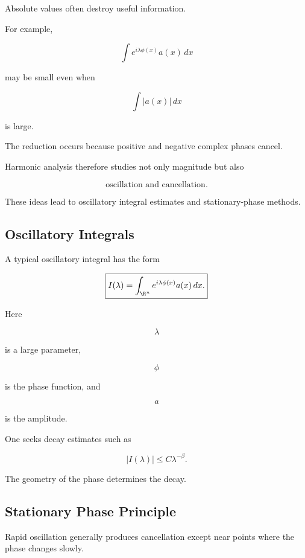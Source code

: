 Absolute values often destroy useful information.

For example,

\[
\int
e^{i\lambda\phi(x)}
a(x)\,dx
\]

may be small even when

\[
\int|a(x)|\,dx
\]

is large.

The reduction occurs because positive and negative complex phases cancel.

Harmonic analysis therefore studies not only magnitude but also

\[
\boxed{
\text{oscillation and cancellation}.
}
\]

These ideas lead to oscillatory integral estimates and stationary-phase
methods.

\subsection{Oscillatory Integrals}
\label{subsec:oscillatory-integrals}

A typical oscillatory integral has the form

\[
\boxed{
I(\lambda)
=
\int_{\R^n}
e^{i\lambda\phi(x)}
a(x)\,dx.
}
\]

Here

\[
\lambda
\]

is a large parameter,

\[
\phi
\]

is the phase function, and

\[
a
\]

is the amplitude.

One seeks decay estimates such as

\[
\boxed{
|I(\lambda)|
\leq
C\lambda^{-\beta}.
}
\]

The geometry of the phase determines the decay.

\subsection{Stationary Phase Principle}
\label{subsec:stationary-phase-preview}

Rapid oscillation generally produces cancellation except near points
where the phase changes slowly.

